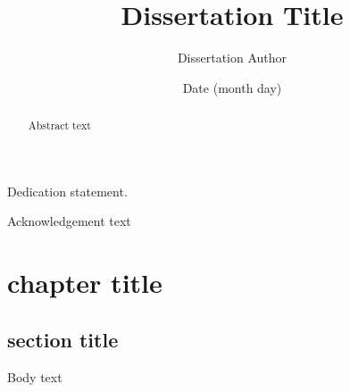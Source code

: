 \documentclass[12pt, pdftex]{cmu_mse_dissertation}
\begin{document}
 

\frontmatter

\pagestyle{empty}

\title{\bf \textsf{Dissertation Title}}
\author{Dissertation Author}
\date{Date (month day)}


\support{}
\disclaimer{}


\maketitle

\begin{dedication}
Dedication statement.
\end{dedication}

\begin{keywordspage}

\end{keywordspage}
\pagestyle{plain} %


\begin{abstract}
Abstract text
\end{abstract}

\begin{acknowledgments}
Acknowledgement text
\end{acknowledgments}

\tableofcontents
\listoffigures
\listoftables

\mainmatter

\chapter{chapter title}
\section{section title}
Body text \cite{ref1}
%
%
%
%
%
\end{document}
